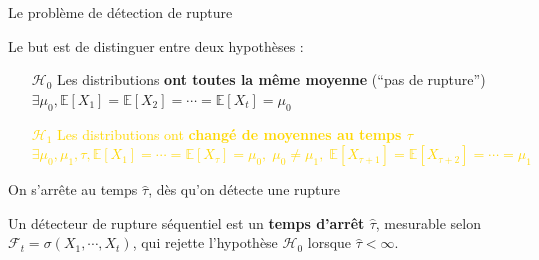 \documentclass[11pt,french,ignorenonframetext,]{beamer}
\begin{document}
\begin{frame}{Le problème de détection de rupture}



    \alert{Le but} est de distinguer entre deux hypothèses :
    \begin{itemize}
      \item[\textcolor{deeppurple}{$\mathcal{H}_0$}] \textcolor{deeppurple}{Les distributions \textbf{ont toutes la même moyenne} \hfill{} (``pas de rupture'')\\
      $\exists \mu_0, \mathbb{E}[X_1] = \mathbb{E}[X_2] = \cdots = \mathbb{E}[X_t] = \mu_0$}

      \item[\textcolor{gold}{$\mathcal{H}_1$}] \textcolor{gold}{Les distributions ont \textbf{changé de moyennes au temps $\tau$} \\
      $\exists \mu_0, \mu_1, \tau, \mathbb{E}[X_1] = \cdots = \mathbb{E}[X_{\tau}] = \mu_0, \; \mu_0 \neq \mu_1, \; \mathbb{E}[X_{\tau+1}] = \mathbb{E}[X_{\tau+2}] = \cdots = \mu_1$}
    \end{itemize}
    On s'arrête au temps $\widehat{\tau}$, dès qu'on détecte une rupture

  \vspace*{20pt}

  \pause
  Un \alert{détecteur de rupture séquentiel} est un \alert{\textbf{temps d'arrêt $\widehat{\tau}$}},
  mesurable selon $\mathcal{F}_t = \sigma(X_1,\cdots,X_t)$,
  qui rejette l'hypothèse \textcolor{deeppurple}{$\mathcal{H}_0$}
  lorsque $\widehat{\tau} < \infty$.

\end{frame}
\end{document}
